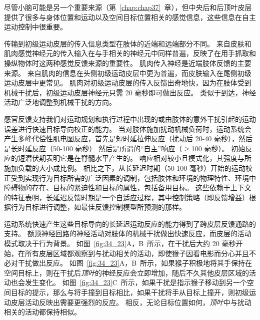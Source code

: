 尽管小脑可能是另一个重要来源（第~\ref{chap:chap37}~章），但中央后和后顶叶皮层提供了很多与身体位置和运动以及空间目标位置相关的感觉信息，这些信息在自主运动控制中很重要。


传输到初级运动皮层的传入信息类型在肢体的近端和远端部分不同。
来自皮肤和肌肉感觉神经元的传入输入在与手相关的神经元中同样普遍，反映了在用手抓取和操纵物体时这两种感觉反馈来源的重要性。
肌肉传入神经是近端肢体反馈的主要来源。
来自肌肉的信息在头侧初级运动皮层中更为普遍，而皮肤输入在尾侧初级运动皮层中更常见。
肌肉对初级运动皮层的传入反馈出奇地快，因为在肢体受到机械干扰后，初级运动皮层神经元只需 20 毫秒即可做出反应。
类似于到达，神经活动广泛地调整到机械干扰的方向。


感官反馈支持我们对运动规划和执行过程中出现的或由肢体的意外干扰引起的运动误差进行快速目标导向校正的能力。
当对肢体施加扰动机械负荷时，运动系统会产生多峰代偿性肌电图反应，首先是短时延拉伸反应（扰动后 20-40 毫秒），然后是长时延反应（50-100 毫秒） 然后是所谓的“自主”响应（$\geq$100 毫秒）。
初始反应的短潜伏期表明它是在脊髓水平产生的。
响应相对较小且模式化，其强度与所施加负载的大小成比例。
相比之下，从长延迟时期（50-100 毫秒）开始的运动校正受到实现行为目标所需的广泛因素的调制，包括肢体和环境的物理特性、环境中障碍物的存在、目标的紧迫性和目标的属性，包括备用目标。
这些依赖于上下文的特征表明，长延迟反馈时期是一个自适应过程，其中控制策略（即反馈增益）根据行为目标进行调整，如最佳反馈控制模型所预测的那样。


运动系统快速产生这些目标导向的长延迟运动反应的能力得到了跨皮层反馈通路的支持。
额顶神经回路的神经活动对肢体的机械干扰做出快速反应，而皮层的活动模式取决于行为背景。
如图~\ref{fig:34_23}A，B~所示，在干扰后大约 20 毫秒开始，在所有皮层区域都观察到与扰动相关的活动，即使猴子因看电影而分心并且不必对干扰做出反应。
如图~\ref{fig:34_23}A，B~所示，如果猴子积极地将其手保持在空间目标上，则在干扰后\textit{顶叶}的神经反应会立即增加，随后不久其他皮层区域的活动也会发生变化。
如图~\ref{fig:34_23}C~所示，如果干扰是指示猴子移动到另一个空间目标的提示，那么与将手撞到目标相比，如果干扰将手从目标上撞开，则初级运动皮层活动反映出需要更强烈的反应。
相反，无论目标位置如何，\textit{顶叶}中与扰动相关的活动都保持相似。



